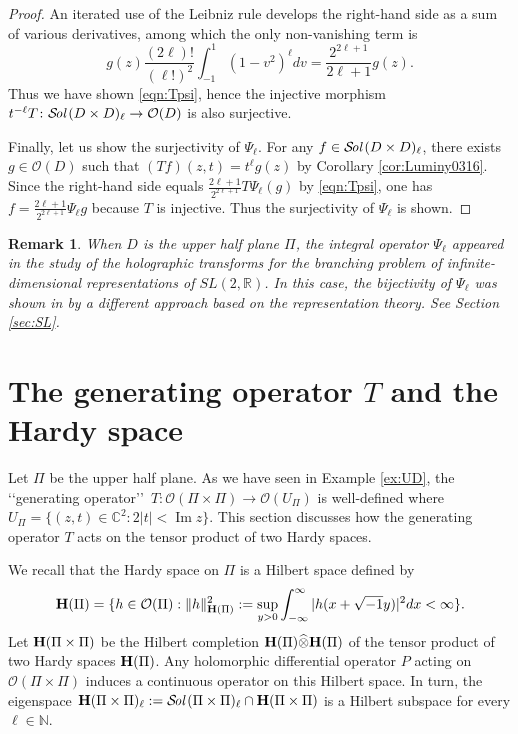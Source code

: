 \documentclass[12pt,leqno]{amsart}
\theoremstyle{plain}
\newtheorem{remark}[thm]{Remark}
\theoremstyle{definition}
\newcommand\Sol{{\mathcal {S}}\!{\text{\it{ol}}}\,}
\begin{document}
\begin{proof}
An iterated use of the Leibniz rule develops the right-hand side
 as a sum of various derivatives, 
 among which the only non-vanishing term is 
\[ g(z)\frac{(2 \ell)!}{(\ell!)^2}
   \int_{-1}^1 (1-v^2)^{\ell} d v 
= \frac{2^{2\ell+1}}{2 \ell+1}g(z).  
\]
Thus we have shown \eqref{eqn:Tpsi}, 
 hence the injective morphism
 $t^{-\ell}T \colon \Sol(D \times D)_{\ell} \to {\mathcal{O}}(D)$
 is also surjective.  



Finally, 
 let us show the surjectivity of $\Psi_{\ell}$.  
For any $f \in \Sol(D \times D)_{\ell}$, 
 there exists $g \in {\mathcal{O}}(D)$
 such that
$(T f)(z,t)=t^{\ell}g (z)$
 by Corollary \ref{cor:Luminy0316}.  
Since the right-hand side equals 
 $\frac{2\ell+1}{2^{2\ell+1}} T \Psi_{\ell}(g)$
  by \eqref{eqn:Tpsi}, 
 one has 
 $f=\frac{2\ell+1}{2^{2\ell+1}} \Psi_{\ell}g$
 because $T$ is injective.  
Thus the surjectivity of $\Psi_{\ell}$ is shown.  
\end{proof}



\begin{remark}
When $D$ is the upper half plane $\Pi$, 
 the integral operator $\Psi_{\ell}$ appeared
 in the study of the {\it{holographic transforms}}
 for the branching problem
 of infinite-dimensional representations
 of $SL(2,{\mathbb{R}})$.  
In this case, 
 the bijectivity of $\Psi_{\ell}$ was shown in \cite{KP20}
 by a different approach based on the representation theory.  
See Section \ref{sec:SL}.  
\end{remark}


\section{The generating operator $T$ and the Hardy space}
\label{sec:Hardy}



Let $\Pi$ be the upper half plane.  
As we have seen in Example \ref{ex:UD}, 
 the \lq\lq{generating operator}\rq\rq\
 $T \colon {\mathcal{O}}(\Pi \times \Pi) \to {\mathcal{O}}(U_{\Pi})$
 is well-defined
 where $U_{\Pi}=\{(z,t) \in {\mathbb{C}}^2: 2|t|< \operatorname{Im}z\}$.  
This section discusses how the generating operator $T$ acts
 on the tensor product 
 of two Hardy spaces.  



We recall that the Hardy space
 on $\Pi$
 is a Hilbert space defined by 
\[
  {\bf{H}}(\Pi)
 =\{h \in {\mathcal{O}}(\Pi):
  \|h \|_{{\bf{H}}(\Pi)}^2 := \sup_{y>0} \int_{-\infty}^{\infty} |h(x+\sqrt{-1}y)|^2 d x < \infty\}.  
\]
Let ${\bf{H}}(\Pi \times \Pi)$ be the Hilbert completion
 ${\bf{H}}(\Pi) \widehat {\otimes} {\bf{H}}(\Pi)$
 of the tensor product
 of two Hardy spaces ${\bf{H}}(\Pi)$.  
Any holomorphic differential operator $P$ 
 acting on ${\mathcal{O}}(\Pi \times \Pi)$ induces a continuous operator
 on this Hilbert space.    
In turn,
 the eigenspace  
$
   {\bf{H}}(\Pi \times \Pi)_{\ell}:=\Sol(\Pi \times \Pi)_{\ell} \cap {\bf{H}}(\Pi \times \Pi)
$
 is a Hilbert subspace for every $\ell \in {\mathbb{N}}$.  
\end{document}
